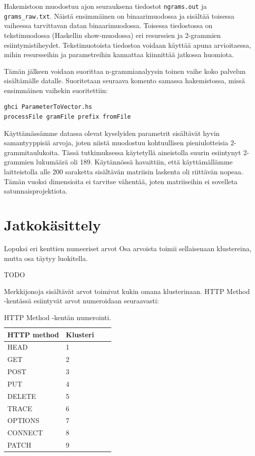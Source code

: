 Hakemistoon muodostuu ajon seurauksena tiedostot \texttt{ngrams.out}
ja \texttt{grams\_raw.txt}. Näistä ensimmäinen on binaarimuodossa ja
sisältää toisessa vaiheessa tarvittavan datan
binaarimuodossa. Toisessa tiedostossa on tekstimuodossa (Haskellin
show-muodossa) eri resurssien ja 2-grammien
esiintymistiheydet. Tekstimuotoista tiedostoa voidaan käyttää apuna
arvioitaessa, mihin resursseihin ja parametreihin kannattaa kiinnittää
jatkossa huomiota.

Tämän jälkeen voidaan suorittaa n-grammianalyysin toinen vaihe koko
palvelun sisältämälle datalle. Suoritetaan seuraava komento samassa
hakemistossa, missä ensimmäinen vaihekin suoritettiin:

\begin{lstlisting}[language=bashshell]
ghci ParameterToVector.hs
processFile gramFile prefix fromFile
\end{lstlisting} 

Käyttämässämme datassa olevat kyselyiden parametrit sisältävät hyvin
samantyyppisiä arvoja, joten niistä muodostuu kohtuullisen
pieniulotteisia 2-grammitaulukoita. Tässä tutkimuksessa käytetyllä
aineistolla suurin esiintynyt 2-grammien lukumäärä oli
189. Käytännössä havaittiin, että käyttämällämme laitteistolla alle
200 saraketta sisältävän matriisin laskenta oli riittävän
nopeaa. Tämän vuoksi dimensioita ei tarvitse vähentää, joten matriiseihin ei sovelleta
satunnaisprojektiota.


\section{Jatkokäsittely}

Lopuksi eri kenttien  numeeriset arvot Osa arvoista toimii
sellaisenaan klustereina, mutta osa täytyy luokitella.

TODO

Merkkijonoja sisältävät arvot toimivat kukin omana klusterinaan. HTTP
Method -kentässä esiintyvät arvot numeroidaan seuraavasti:

\begin{table}[h]
\centering
\begin{tabular}{llll}
HTTP method & Klusteri \\
\hline
HEAD & 1 \\
GET & 2 \\
POST & 3 \\
PUT & 4 \\
DELETE & 5 \\
TRACE & 6 \\
OPTIONS & 7 \\
CONNECT & 8 \\
PATCH & 9 \\

\end{tabular}
\caption{HTTP Method -kentän numerointi.}
\label{tiedostot}
\end{table}


